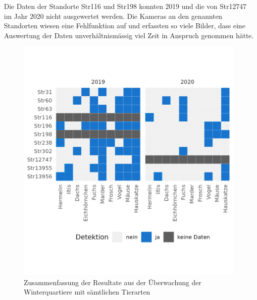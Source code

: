 \documentclass[
]{scrbook}
\begin{document}
Die Daten der Standorte Str116 und Str198 konnten 2019 und die von Str12747 im Jahr 2020 nicht ausgewertet werden. Die Kameras an den genannten Standorten wiesen eine Fehlfunktion auf und erfassten so viele Bilder, dass eine Auswertung der Daten unverhältnismässig viel Zeit in Anspruch genommen hätte.



\begin{figure}
\includegraphics[width=1\linewidth]{images/winterquartiere_resultate} \caption{Zusammenfassung der Resultate aus der Überwachung der Winterquartiere mit sämtlichen Tierarten}\label{fig:winterquartiereresultate}
\end{figure}
\end{document}
